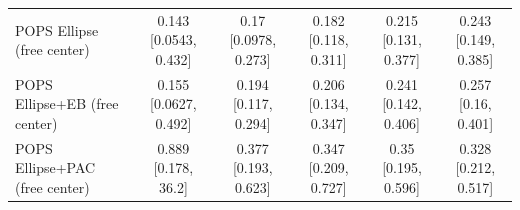 \begin{tabular}{lccccc}
POPS Ellipse (free center) & 0.143 {\scriptsize[0.0543, 0.432]} & 0.17 {\scriptsize[0.0978, 0.273]} & 0.182 {\scriptsize[0.118, 0.311]} & 0.215 {\scriptsize[0.131, 0.377]} & 0.243 {\scriptsize[0.149, 0.385]} \\
POPS Ellipse+EB (free center) & 0.155 {\scriptsize[0.0627, 0.492]} & 0.194 {\scriptsize[0.117, 0.294]} & 0.206 {\scriptsize[0.134, 0.347]} & 0.241 {\scriptsize[0.142, 0.406]} & 0.257 {\scriptsize[0.16, 0.401]} \\
POPS Ellipse+PAC (free center) & 0.889 {\scriptsize[0.178, 36.2]} & 0.377 {\scriptsize[0.193, 0.623]} & 0.347 {\scriptsize[0.209, 0.727]} & 0.35 {\scriptsize[0.195, 0.596]} & 0.328 {\scriptsize[0.212, 0.517]} \\
\bottomrule
\end{tabular}

